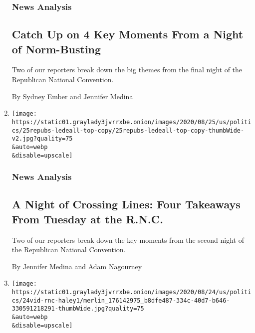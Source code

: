 \begin{enumerate}
  \hypertarget{news-analysis}{%
  \subsubsection{News Analysis}\label{news-analysis}}

  \hypertarget{catch-up-on-4-key-moments-from-a-night-of-norm-busting}{%
  \subsection{Catch Up on 4 Key Moments From a Night of
  Norm-Busting}\label{catch-up-on-4-key-moments-from-a-night-of-norm-busting}}

  Two of our reporters break down the big themes from the final night of
  the Republican National Convention.

  By Sydney Ember and Jennifer Medina
\item
  \href{/2020/08/26/us/politics/rnc-convention.html}{}

  \texttt{[image: https://static01.graylady3jvrrxbe.onion/images/2020/08/25/us/politics/25repubs-ledeall-top-copy/25repubs-ledeall-top-copy-thumbWide-v2.jpg?quality=75\\\&auto=webp\\\&disable=upscale]}

  \hypertarget{news-analysis-1}{%
  \subsubsection{News Analysis}\label{news-analysis-1}}

  \hypertarget{a-night-of-crossing-lines-four-takeaways-from-tuesday-at-the-rnc}{%
  \subsection{A Night of Crossing Lines: Four Takeaways From Tuesday at
  the
  R.N.C.}\label{a-night-of-crossing-lines-four-takeaways-from-tuesday-at-the-rnc}}

  Two of our reporters break down the key moments from the second night
  of the Republican National Convention.

  By Jennifer Medina and Adam Nagourney
\item
  \href{/2020/08/25/us/politics/nikki-haley-rnc-speech.html}{}

  \texttt{[image: https://static01.graylady3jvrrxbe.onion/images/2020/08/24/us/politics/24vid-rnc-haley1/merlin\_176142975\_b8dfe487-334c-40d7-b646-330591218291-thumbWide.jpg?quality=75\\\&auto=webp\\\&disable=upscale]}


\end{enumerate}
